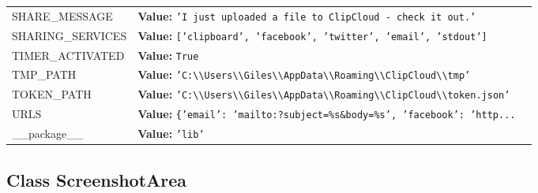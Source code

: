 \begin{longtable}{|p{\varnamewidth}|p{\vardescrwidth}|l}
\cline{1-2}
\raggedright S\-H\-A\-R\-E\-\_\-M\-E\-S\-S\-A\-G\-E\- & \raggedright \textbf{Value:} 
{\tt \texttt{'}\texttt{I just uploaded a file to ClipCloud - check it out.}\texttt{'}}&\\
\cline{1-2}
\raggedright S\-H\-A\-R\-I\-N\-G\-\_\-S\-E\-R\-V\-I\-C\-E\-S\- & \raggedright \textbf{Value:} 
{\tt \texttt{[}\texttt{'}\texttt{clipboard}\texttt{'}\texttt{, }\texttt{'}\texttt{facebook}\texttt{'}\texttt{, }\texttt{'}\texttt{twitter}\texttt{'}\texttt{, }\texttt{'}\texttt{email}\texttt{'}\texttt{, }\texttt{'}\texttt{stdout}\texttt{'}\texttt{]}}&\\
\cline{1-2}
\raggedright T\-I\-M\-E\-R\-\_\-A\-C\-T\-I\-V\-A\-T\-E\-D\- & \raggedright \textbf{Value:} 
{\tt True}&\\
\cline{1-2}
\raggedright T\-M\-P\-\_\-P\-A\-T\-H\- & \raggedright \textbf{Value:} 
{\tt \texttt{'}\texttt{C:{\textbackslash}{\textbackslash}Users{\textbackslash}{\textbackslash}Giles{\textbackslash}{\textbackslash}AppData{\textbackslash}{\textbackslash}Roaming{\textbackslash}{\textbackslash}ClipCloud{\textbackslash}{\textbackslash}tmp}\texttt{'}}&\\
\cline{1-2}
\raggedright T\-O\-K\-E\-N\-\_\-P\-A\-T\-H\- & \raggedright \textbf{Value:} 
{\tt \texttt{'}\texttt{C:{\textbackslash}{\textbackslash}Users{\textbackslash}{\textbackslash}Giles{\textbackslash}{\textbackslash}AppData{\textbackslash}{\textbackslash}Roaming{\textbackslash}{\textbackslash}ClipCloud{\textbackslash}{\textbackslash}token.json}\texttt{'}}&\\
\cline{1-2}
\raggedright U\-R\-L\-S\- & \raggedright \textbf{Value:} 
{\tt \texttt{\{}\texttt{'}\texttt{email}\texttt{'}\texttt{: }\texttt{'}\texttt{mailto:?subject=\%s\&body=\%s}\texttt{'}\texttt{, }\texttt{'}\texttt{facebook}\texttt{'}\texttt{: }\texttt{'}\texttt{http}\texttt{...}}&\\
\cline{1-2}
\raggedright \_\-\_\-p\-a\-c\-k\-a\-g\-e\-\_\-\_\- & \raggedright \textbf{Value:} 
{\tt \texttt{'}\texttt{lib}\texttt{'}}&\\
\cline{1-2}
\end{longtable}



\subsection{Class ScreenshotArea}

